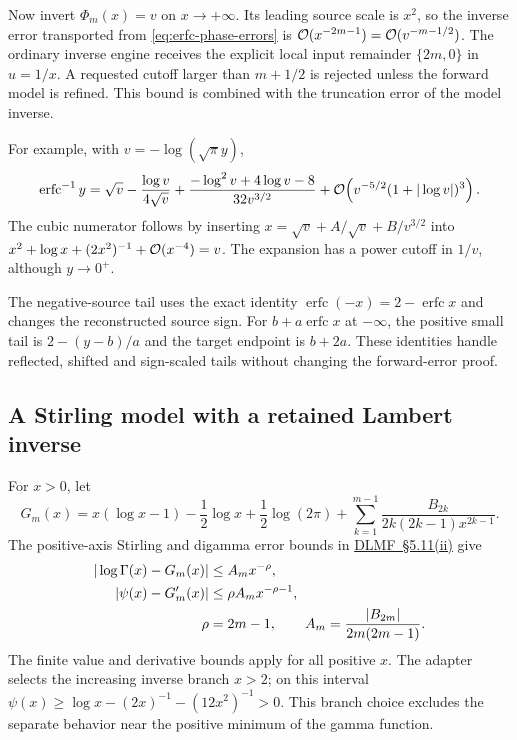 Now invert $\Phi_m(x)=v$ on $x\to+\infty$. Its leading source scale is
$x^2$, so the inverse error transported from \eqref{eq:erfc-phase-errors}
is $\mathcal O(x^{-2m-1})=\mathcal O(v^{-m-1/2})$. The ordinary inverse engine receives
the explicit local input remainder $\{2m,0\}$ in $u=1/x$. A requested
cutoff larger than $m+1/2$ is rejected unless the forward model is refined.
This bound is combined with the truncation error of the model inverse.

For example, with $v=-\log(\sqrt\pi y)$,
\begin{equation}
 \operatorname{erfc}^{-1}y
 =\sqrt v-\frac{\log v}{4\sqrt v}
 +\frac{-\log^2v+4\log v-8}{32v^{3/2}}
 +\mathcal O\!\left(v^{-5/2}(1+|\log v|)^3\right).
 \label{eq:erfc-inverse-first-terms}
\end{equation}
The cubic numerator follows by inserting
$x=\sqrt v+A/\sqrt v+B/v^{3/2}$ into
$x^2+\log x+(2x^2)^{-1}+\mathcal O(x^{-4})=v$.
The expansion has a power cutoff in $1/v$, although $y\to0^+$.

The negative-source tail uses the exact identity
$\operatorname{erfc}(-x)=2-\operatorname{erfc}x$ and changes the
reconstructed source sign. For $b+a\operatorname{erfc}x$ at $-\infty$,
the positive small tail is $2-(y-b)/a$ and the target endpoint is $b+2a$.
These identities handle reflected, shifted and sign-scaled tails without
changing the forward-error proof.

\subsection{A Stirling model with a retained Lambert inverse}

For $x>0$, let
\begin{equation}
 G_m(x)=x(\log x-1)-\frac12\log x+\frac12\log(2\pi)
 +\sum_{k=1}^{m-1}\frac{B_{2k}}{2k(2k-1)x^{2k-1}}.
 \label{eq:stirling-finite-model}
\end{equation}
The positive-axis Stirling and digamma error bounds in
\href{https://dlmf.nist.gov/5.11.ii}{DLMF~\S5.11(ii)} give
\begin{align}
 |\log\Gamma(x)-G_m(x)|&\le A_mx^{-\rho},
 \label{eq:stirling-value-bound}\\
 |\psi(x)-G_m'(x)|&\le\rho A_mx^{-\rho-1},
 \label{eq:stirling-derivative-bound}\\
 \rho&=2m-1,\qquad
 A_m=\frac{|B_{2m}|}{2m(2m-1)}.
 \notag
\end{align}
The finite value and derivative bounds apply for all positive $x$.
The adapter selects the increasing inverse branch $x>2$; on this interval
$\psi(x)\ge\log x-(2x)^{-1}-(12x^2)^{-1}>0$.
This branch choice excludes the separate behavior near the positive
minimum of the gamma function.

